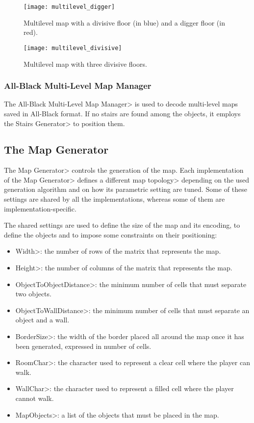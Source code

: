 \begin{figure}[tb]
\begin{minipage}[t]{0.48\linewidth}
	\texttt{[image: multilevel\_digger]}
	\caption{Multilevel map with a divisive floor (in blue) and a digger floor (in red).}
	\label{fig:multilevel_digger}
\end{minipage}
\begin{minipage}[t]{0.48\linewidth}
	\texttt{[image: multilevel\_divisive]}
	\caption{Multilevel map with three divisive floors.}
	\label{fig:multilevel_divisive}
\end{minipage}
\end{figure}

\subsubsection{All-Black Multi-Level Map Manager}

The \<All-Black Multi-Level Map Manager> is used to decode multi-level maps saved in All-Black format. If no stairs are found among the objects, it employs the \<Stairs Generator> to position them.


\subsection{The Map Generator}

The \<Map Generator> controls the generation of the map. Each implementation of the \<Map Generator> defines a different \<map topology> depending on the used generation algorithm and on how its parametric setting are tuned. Some of these settings are shared by all the implementations, whereas some of them are implementation-specific.

\par

The shared settings are used to define the size of the map and its encoding, to define the objects and to impose some constraints on their positioning:

\begin{itemize}
\item \<Width>: the number of rows of the matrix that represents the map.
\item \<Height>: the number of columns of the matrix that represents the map.
\item \<ObjectToObjectDistance>: the minimum number of cells that must separate two objects. 
\item \<ObjectToWallDistance>: the minimum number of cells that must separate an object and a wall.
\item \<BorderSize>: the width of the border placed all around the map once it has been generated, expressed in number of cells.
\item \<RoomChar>: the character used to represent a clear cell where the player can walk.
\item \<WallChar>: the character used to represent a filled cell where the player cannot walk.
\item \<MapObjects>: a list of the objects that must be placed in the map.
\end{itemize}

